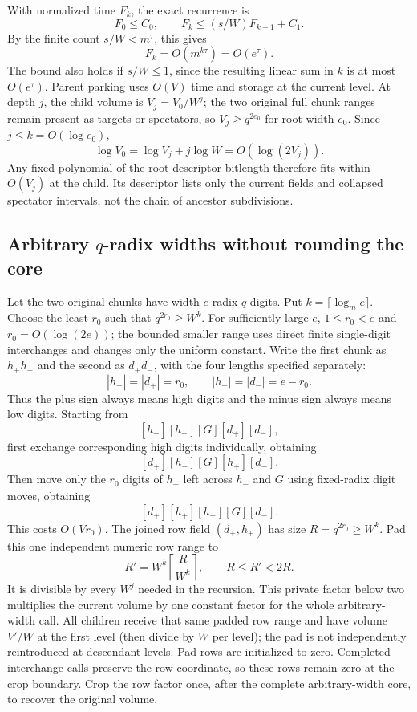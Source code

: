 With normalized time $F_k$, the exact recurrence is
\[
 F_0\le C_0,\qquad
 F_k\le(s/W)F_{k-1}+C_1.
\]
By the finite count $s/W<m^\tau$, this gives
\[
                         F_k=O(m^{k\tau})=O(e^\tau).
\]
The bound also holds if $s/W\le1$, since the resulting linear sum in
$k$ is at most $O(e^\tau)$.  Parent parking uses $O(V)$ time and
storage at the current level.  At depth $j$, the child volume is
$V_j=V_0/W^j$; the two original full chunk ranges remain present as
targets or spectators, so $V_j\ge q^{2e_0}$ for root width $e_0$.
Since $j\le k=O(\log e_0)$,
\[
 \log V_0=\log V_j+j\log W=O(\log(2V_j)).
\]
Any fixed polynomial of the root descriptor bitlength therefore fits
within $O(V_j)$ at the child.  Its descriptor lists only the current
fields and collapsed spectator intervals, not the chain of ancestor
subdivisions.

\subsection{Arbitrary $q$-radix widths without rounding the core}

Let the two original chunks have width $e$ radix-$q$ digits.  Put
$k=\lceil\log_m e\rceil$.  Choose the least $r_0$ such that
$q^{2r_0}\ge W^k$.  For sufficiently large $e$, $1\le r_0<e$ and
$r_0=O(\log(2e))$; the bounded smaller range uses direct finite
single-digit interchanges and changes only the uniform constant.
Write the first chunk as $h_+h_-$ and the second as $d_+d_-$,
with the four lengths specified separately:
\[
 |h_+|=|d_+|=r_0,\qquad |h_-|=|d_-|=e-r_0.
\]
Thus the plus sign always means high digits and the minus sign
always means low digits. Starting from
\[
 [h_+][h_-][G][d_+][d_-],
\]
first exchange corresponding high digits individually, obtaining
\[
 [d_+][h_-][G][h_+][d_-].
\]
Then move only the $r_0$ digits of $h_+$ left across $h_-$ and $G$
using fixed-radix digit moves, obtaining
\[
 [d_+][h_+][h_-][G][d_-].
\]
This costs $O(Vr_0)$.  The joined row field $(d_+,h_+)$ has size
$R=q^{2r_0}\ge W^k$.  Pad this one independent numeric row range to
\[
 R'=W^k\left\lceil\frac{R}{W^k}\right\rceil,
                   \qquad R\le R'<2R.
\]
It is divisible by every $W^j$ needed in the recursion.  This private
factor below two multiplies the current volume by one constant factor for
the whole arbitrary-width call.  All children receive that same padded
row range and have volume $V'/W$ at the first level (then divide by $W$
per level); the pad is not independently reintroduced at descendant
levels.  Pad rows are initialized to zero.  Completed interchange calls
preserve the row coordinate, so these rows remain zero at the crop
boundary.  Crop the row factor once, after the complete arbitrary-width
core, to recover the original volume.

